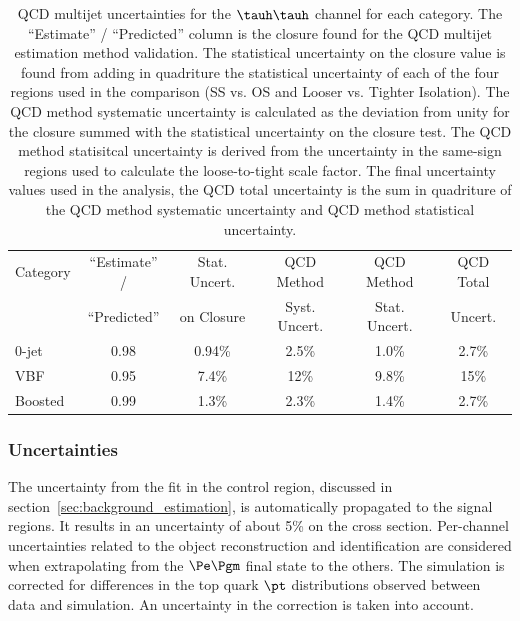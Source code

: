\begin{table}[htbp]
\centering
\begin{tabular}{|l|c|c|c|c|c|}
\hline
Category & ``Estimate'' /  & Stat. Uncert. &  QCD Method    &  QCD Method    &  QCD Total \\
         & ``Predicted''   &    on Closure &  Syst. Uncert. &  Stat. Uncert. &  Uncert.   \\
\hline
0-jet    & 0.98 & 0.94\% & 2.5\% & 1.0\%  & 2.7\%  \\\hline
VBF      & 0.95 & 7.4\%  & 12\%  & 9.8\%  & 15\%   \\\hline
Boosted  & 0.99 & 1.3\%  & 2.3\% & 1.4\%  & 2.7\%  \\\hline
\end{tabular}
\label{tab:htt_tt_qcd_closure}
\caption{
QCD multijet uncertainties for the $\tauh\tauh$ channel for each category. The ``Estimate'' /
``Predicted'' column is the closure found for the QCD multijet estimation method validation.
The statistical uncertainty on the closure value is found from adding in quadriture the statistical uncertainty
of each of the four regions used in the comparison (SS vs. OS and Looser vs. Tighter Isolation).
The QCD method systematic uncertainty is calculated as the deviation from unity for the closure summed
with the statistical uncertainty on the closure test. The QCD method statisitcal uncertainty
is derived from the uncertainty in the same-sign regions used to calculate the loose-to-tight
scale factor. The final uncertainty values used in the analysis, the QCD total uncertainty is the sum in 
quadriture of the QCD method systematic uncertainty and QCD method statistical uncertainty.
}
\end{table}


\subsubsection{\ttbar Uncertainties}
The uncertainty from the fit in the \ttbar control region, discussed in section~\ref{sec:background_estimation}, 
is automatically propagated to the signal regions. It results in an uncertainty of about 5\% on the 
\ttbar cross section. Per-channel uncertainties related to the object reconstruction and identification are 
considered when extrapolating from the $\Pe\Pgm$ final state to the others. The \ttbar simulation is corrected 
for differences in the top quark $\pt$ distributions observed between data and simulation. An uncertainty 
in the correction is taken into account.


